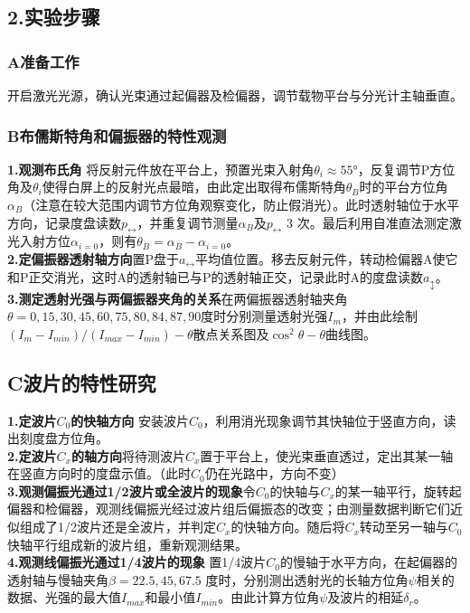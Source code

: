 \documentclass{ctexart}
\begin{document}
\subsection*{2.\quad 实验步骤}
\subsubsection*{A\quad 准备工作}
\noindent 开启激光光源，确认光束通过起偏器及检偏器，调节载物平台与分光计主轴垂直。
\subsubsection*{B\quad 布儒斯特角和偏振器的特性观测}
\noindent \textbf{1.观测布氏角} \quad 将反射元件放在平台上，预置光束入射角$\theta_i\approx 55°$，反复调节P方位角及$\theta_i$使得白屏上的反射光点最暗，由此定出取得布儒斯特角$\theta_B$时的平台方位角$\alpha_B$（注意在较大范围内调节方位角观察变化，防止假消光）。此时透射轴位于水平方向，记录度盘读数$p_{\leftrightarrow}$，并重复调节测量$\alpha_{B}$及$p_{\leftrightarrow}$ 3 次。最后利用自准直法测定激光入射方位$\alpha_{i=0}$，则有$\theta_B=\alpha_B-\alpha_{i=0}$。\\
\noindent \textbf{2.定偏振器透射轴方向}\quad 置P盘于$a_{\leftrightarrow}$平均值位置。移去反射元件，转动检偏器A使它和P正交消光，这时A的透射轴已与P的透射轴正交，记录此时A的度盘读数$a_{\updownarrow}$。\\
\noindent \textbf{3.测定透射光强与两偏振器夹角的关系}\quad 在两偏振器透射轴夹角$\theta=0,15,30,45,60,75,80,84,87,90$度时分别测量透射光强$I_m$，并由此绘制$(I_{m}-I_{min})/(I_{max}-I_{min})-\theta$散点关系图及$\cos^2{\theta}-\theta$曲线图。
\subsection*{C\quad 波片的特性研究}
\noindent \textbf{1.定波片$C_0$的快轴方向} \quad 安装波片$C_0$，利用消光现象调节其快轴位于竖直方向，读出刻度盘方位角。\\ 
\noindent \textbf{2.定波片$C_x$的轴方向}\quad 将待测波片$C_x$置于平台上，使光束垂直透过，定出其某一轴在竖直方向时的度盘示值。（此时$C_0$仍在光路中，方向不变）\\
\noindent \textbf{3.观测偏振光通过1/2波片或全波片的现象}\quad 令$C_0$的快轴与$C_x$的某一轴平行，旋转起偏器和检偏器，观测线偏振光经过波片组后偏振态的改变；由测量数据判断它们近似组成了1/2波片还是全波片，并判定$C_x$的快轴方向。随后将$C_x$转动至另一轴与$C_0$快轴平行组成新的波片组，重新观测结果。\\
\noindent \textbf{4.观测线偏振光通过1/4波片的现象} \quad 置1/4波片$C_0$的慢轴于水平方向，在起偏器的透射轴与慢轴夹角$\beta=22.5, 45, 67.5$ 度时，分别测出透射光的长轴方位角$\psi$相关的数据、光强的最大值$I_{max}$和最小值$I_{min}$。由此计算方位角$\psi$及波片的相延$\delta_r$。
\end{document}
